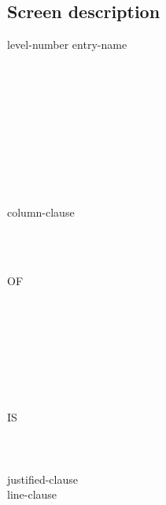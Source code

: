 \subsection{Screen description}
level-number entry-name
\begin{0-1}
  \begin{1=}
     \\
     \\
     \\
  \end{1=} \\


  \begin{1=}
     \\
  \end{1=} \\

   \\

  column-clause \\

  \begin{1=}
     \\
     \\

    \begin{0-1}
       OF
    \end{0-1}
    \begin{1=}
       \\
    \end{1=}
  \end{1=} \\

  \begin{1=}
     \\
     \\
  \end{1=} \\

  IS  \\
   \\

   \\
   \\
  justified-clause \\
  line-clause \\


\end{0-1}
